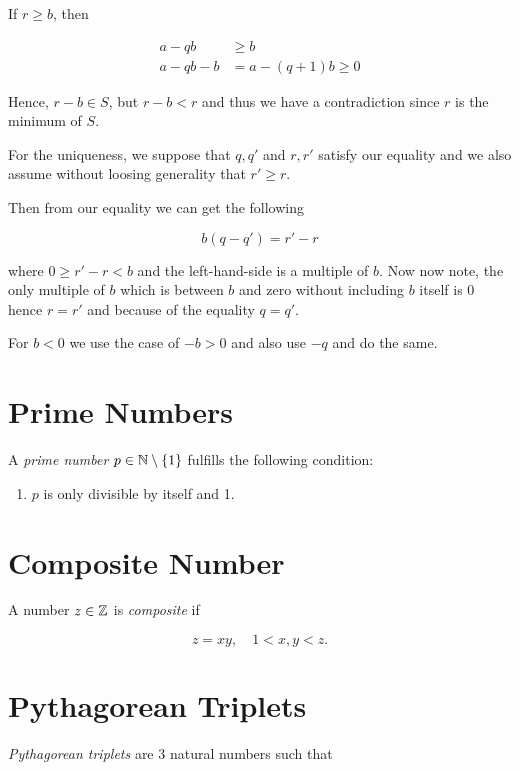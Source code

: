 If \(r \ge b\), then

\begin{align*}
	a - qb     & \ge b                \\
	a - qb - b & = a - (q + 1)b \ge 0
\end{align*}

Hence, \(r - b \in S\), but \(r - b < r\) and thus we have a contradiction since \(r\) is the minimum of \(S\).

For the uniqueness, we suppose that \(q, q'\) and \(r, r'\) satisfy our equality and we also assume without loosing generality that \(r' \ge r\).

Then from our equality we can get the following

\[
	b(q - q') = r' - r
\]

where \(0 \ge r' - r < b\) and the left-hand-side is a multiple of \(b\). Now now note, the only multiple of \(b\) which is between
\(b\) and zero without including \(b\) itself is \(0\) hence \(r = r'\) and because of the equality \(q = q'\).

For \(b < 0\) we use the case of \(-b > 0\) and also use \(-q\) and do the same.

\QED

\section{Prime Numbers}

A \emph{prime number} \(p \in \mathbb{N} \setminus \{1\}\) fulfills the following condition:

\begin{enumerate}[label= \Roman*.]
	\item \(p\) is only divisible by itself and 1.
\end{enumerate}

\section{Composite Number}

A number \(z \in \mathbb{Z}\) is \emph{composite} if

\[
	z = xy, \quad 1 < x,y < z.
\]

\section{Pythagorean Triplets}

\emph{Pythagorean triplets} are 3 natural numbers such that

